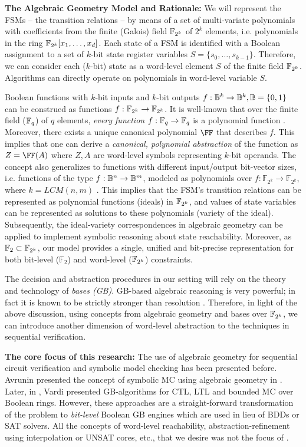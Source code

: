 {\bf The Algebraic Geometry Model and Rationale:} We will represent
the FSMs -- the transition relations -- by means of a set of
multi-variate polynomials with coefficients from the finite (Galois)
field ${\mathbb{F}}_{2^k}$ of $2^k$ elements, i.e. polynomials in the ring
${\mathbb{F}}_{2^k}[x_1,\dots,x_d]$. Each state of a FSM is identified with a
Boolean assignment to a set of $k$-bit state register variables
$S=\{s_0,\dots,s_{k-1}\}$. Therefore, we can consider each ($k$-bit)
state as a word-level element $S$ of the finite field
${\mathbb{F}}_{2^k}$. Algorithms can directly operate on polynomials in word-level
variable $S$. 

Boolean functions with $k$-bit inputs and $k$-bit outputs 
$f: {\mathbb{B}}^k \rightarrow {\mathbb{B}}^k,{\mathbb{B}} = \{0, 1\}$ can be construed as functions
$f: {\mathbb{F}}_{2^k} \rightarrow {\mathbb{F}}_{2^k}$. It is well-known that over the finite
field (${\mathbb{F}}_{q}$) of  $q$ elements, {\it every function} $f: {\mathbb{F}}_{q}
\rightarrow {\mathbb{F}}_{q}$ is a polynomial function \cite{ff:1997}. Moreover,
there exists a unique canonical polynomial $\FF$ that describes $f$.
This implies that one can derive a {\it  canonical, polynomial
  abstraction} of the function as $Z = \FF(A)$ where $Z, A$ are
word-level symbols representing $k$-bit operands. The concept also
generalizes to functions with different input/output bit-vector sizes,
i.e. functions of the type $f: {\mathbb{B}}^n \rightarrow {\mathbb{B}}^m$, modeled as
polynomials over $f:{\mathbb{F}}_{2^k} \rightarrow
{\mathbb{F}}_{2^k}$, where $k=LCM(n,m)$ \cite{ff:1997}.  
This implies that the FSM's transition relations can be
represented as polynomial functions (ideals) in ${\mathbb{F}}_{2^k}$, and values of
state variables can be represented as solutions to these polynomials
(variety of the ideal). Subsequently, the ideal-variety correspondences
in algebraic geometry can be applied to implement symbolic reasoning
about state reachability. Moreover, as ${\mathbb{F}}_2 \subset {\mathbb{F}}_{2^k}$,
our model provides a single, unified and bit-precise representation
for both bit-level (${\mathbb{F}}_2$) and word-level (${\mathbb{F}}_{2^k}$)
constraints.  

The decision and abstraction procedures in our setting will rely on
the theory and technology of {\it \Grobner bases (GB)}. GB-based
algebraic reasoning is very powerful; in fact it is known to be
strictly stronger than resolution \cite{CEI:stoc-96}. Therefore, in
light of the above discussion, using concepts from algebraic geometry
and \Grobner bases over ${\mathbb{F}}_{2^k}$, we can introduce another dimension of
word-level abstraction to the techniques in sequential verification. 


{\bf The core focus of this research:} The use of algebraic geometry
for sequential circuit verification and symbolic model checking has
been presented before. Avrunin presented the
concept of symbolic MC using algebraic geometry in
\cite{Avrunin:CAV}. Later, in \cite{vardi-iasted07}, Vardi presented
GB-algorithms for CTL, LTL and 
bounded MC over Boolean rings. However, these approaches are a
straight-forward transformation of the problem to {\it bit-level}
Boolean GB engines which are used in lieu of BDDs or SAT solvers. All
the concepts of word-level reachability, abstraction-refinement using
interpolation or UNSAT cores, etc., that we desire was not the focus of
\cite{Avrunin:CAV} \cite{vardi-iasted07}. 

